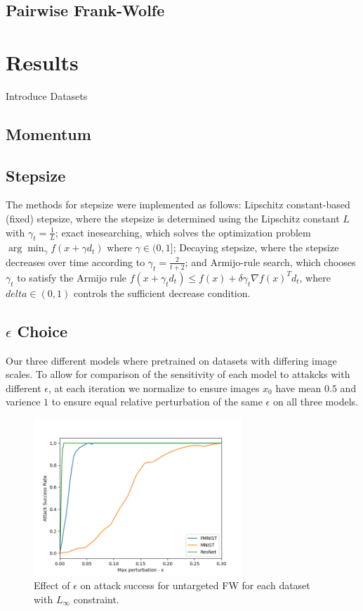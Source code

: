 \documentclass{article}
\begin{document}
\subsection{Pairwise Frank-Wolfe}

\section{Results}
Introduce Datasets
\subsection{Momentum}

\subsection{Stepsize}
The methods for stepsize were implemented as follows: Lipschitz constant-based (fixed) stepsize, where the stepsize is determined using the Lipschitz constant \(L\) with \(\gamma_t = \frac{1}{L}\); exact inesearching, which solves the optimization problem \(\arg \min_{\gamma} f(x + \gamma d_t)\) where \(\gamma \in (0,1]\); Decaying stepsize, where the stepsize decreases over time according to \(\gamma_t = \frac{2}{t + 2}\); and Armijo-rule search, which chooses \(\gamma_t\) to satisfy the Armijo rule \(f(x + \gamma_t d_t) \leq f(x) + \delta \gamma_t \nabla f(x)^T d_t\), where \(delta \in (0,1)\) controls the sufficient decrease condition.

\subsection{$\epsilon$ Choice}
Our three different models where pretrained on datasets with differing image scales. To allow for comparison of the sensitivity of each model to attakcks with different $\epsilon$, at each iteration we normalize to ensure images $x_0$ have mean $0.5$ and varience $1$ to ensure equal relative perturbation of the same $\epsilon$ on all three models. 

\begin{figure}[H]
    \centering
    \includegraphics[width=0.7\textwidth]{plots/eps_choice.png}
    \caption{Effect of $\epsilon$ on attack success for untargeted FW for each dataset with $L_\infty$ constraint.}
    \label{fig:converge-compare}
\end{figure}
\end{document}
